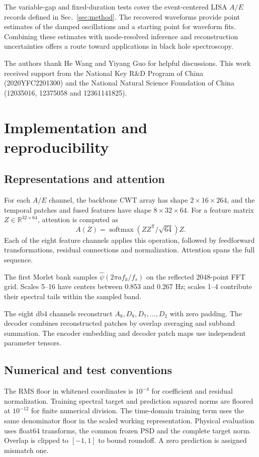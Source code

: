 \documentclass[10pt,prd,aps,a4paper,twocolumn,superscriptaddress,nofootinbib,floatfix]{revtex4-2}
\begin{document}
The variable-gap and fixed-duration tests cover the event-centered LISA $A/E$ records defined in Sec.~\ref{sec:method}. The recovered waveforms provide point estimates of the damped oscillations and a starting point for waveform fits. Combining these estimates with mode-resolved inference and reconstruction uncertainties offers a route toward applications in black hole spectroscopy.

\begin{acknowledgments}
The authors thank He Wang and Yiyang Guo for helpful discussions. This work received support from the National Key R\&D Program of China (2020YFC2201300) and the National Natural Science Foundation of China (12035016, 12375058 and 12361141825).

\end{acknowledgments}
\onecolumngrid
\clearpage
\twocolumngrid
\appendix
\section{Implementation and reproducibility}\label{app:model_analysis}
\subsection{Representations and attention}
For each $A/E$ channel, the backbone CWT array has shape $2\times16\times264$, and the temporal patches and fused features have shape $8\times32\times64$. For a feature matrix $Z\in\mathbb R^{32\times64}$, attention is computed as
\begin{equation}
A(Z)=\operatorname{softmax}(ZZ^{\mathsf T}/\sqrt{64})Z.
\end{equation}
Each of the eight feature channels applies this operation, followed by feedforward transformations, residual connections and normalization. Attention spans the full sequence.

The first Morlet bank samples $\widehat\psi(2\pi a f_k/f_s)$ on the reflected 2048-point FFT grid. Scales 5--16 have centers between 0.853 and 0.267 Hz; scales 1--4 contribute their spectral tails within the sampled band.

The eight db4 channels reconstruct $A_8,D_8,D_7,\ldots,D_2$ with zero padding. The decoder combines reconstructed patches by overlap averaging and subband summation. The encoder embedding and decoder patch maps use independent parameter tensors.

\subsection{Numerical and test conventions}
The RMS floor in whitened coordinates is $10^{-4}$ for coefficient and residual normalization. Training spectral target and prediction squared norms are floored at $10^{-12}$ for finite numerical division. The time-domain training term uses the same denominator floor in the scaled working representation. Physical evaluation uses float64 transforms, the common frozen PSD and the complete target norm. Overlap is clipped to $[-1,1]$ to bound roundoff. A zero prediction is assigned mismatch one.
\end{document}
